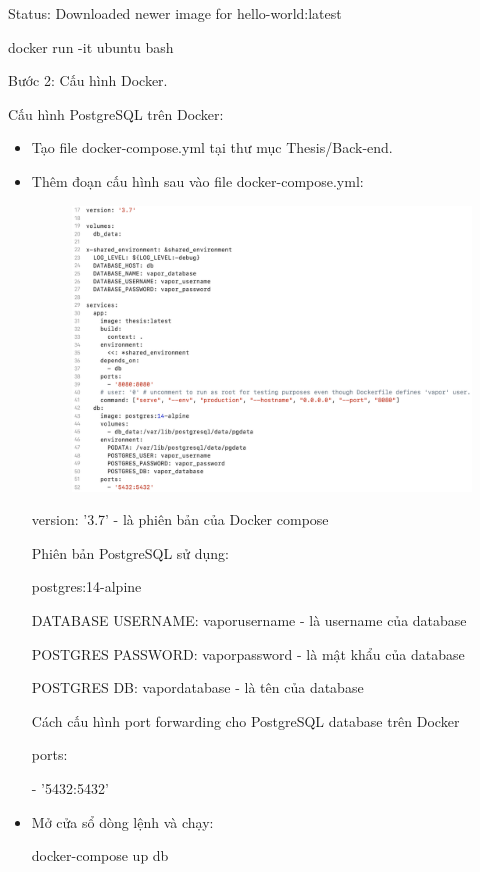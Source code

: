 \documentclass[../DoAn.tex]{subfiles}
\begin{document}
Status: Downloaded newer image for hello-world:latest

docker run -it ubuntu bash

Bước 2: Cấu hình Docker.

Cấu hình PostgreSQL trên Docker:
\begin{itemize}
    \item Tạo file docker-compose.yml tại thư mục Thesis/Back-end.
    \item Thêm đoạn cấu hình sau vào file docker-compose.yml:
        \begin{figure}[H]
            \centering
            \includegraphics[width=1\linewidth]{Hinhve/Deploy/PostgreSQL.png}
        \end{figure}
    version: '3.7' - là phiên bản của Docker compose

    Phiên bản PostgreSQL sử dụng:
    
    postgres:14-alpine
    
    DATABASE USERNAME: vaporusername - là username của database
    
    POSTGRES PASSWORD: vaporpassword - là mật khẩu của database

    POSTGRES DB: vapordatabase - là tên của database

    Cách cấu hình port forwarding cho PostgreSQL database trên Docker
    
    ports:
    
      - '5432:5432'

    \item Mở cửa sổ dòng lệnh và chạy:
    
    docker-compose up db


\end{itemize}
\end{document}
